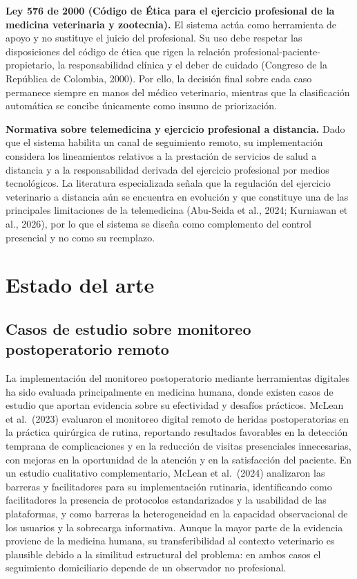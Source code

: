 \documentclass[stu, spanish]{apa7}
\begin{document}
\textbf{Ley 576 de 2000 (C\'{o}digo de \'{E}tica para el ejercicio profesional de la medicina veterinaria y zootecnia).} El sistema act\'{u}a como herramienta de apoyo y no sustituye el juicio del profesional. Su uso debe respetar las disposiciones del c\'{o}digo de \'{e}tica que rigen la relaci\'{o}n profesional-paciente-propietario, la responsabilidad cl\'{i}nica y el deber de cuidado (Congreso de la Rep\'{u}blica de Colombia, 2000). Por ello, la decisi\'{o}n final sobre cada caso permanece siempre en manos del m\'{e}dico veterinario, mientras que la clasificaci\'{o}n autom\'{a}tica se concibe \'{u}nicamente como insumo de priorizaci\'{o}n.

\textbf{Normativa sobre telemedicina y ejercicio profesional a distancia.} Dado que el sistema habilita un canal de seguimiento remoto, su implementaci\'{o}n considera los lineamientos relativos a la prestaci\'{o}n de servicios de salud a distancia y a la responsabilidad derivada del ejercicio profesional por medios tecnol\'{o}gicos. La literatura especializada se\~{n}ala que la regulaci\'{o}n del ejercicio veterinario a distancia a\'{u}n se encuentra en evoluci\'{o}n y que constituye una de las principales limitaciones de la telemedicina (Abu-Seida et al., 2024; Kurniawan et al., 2026), por lo que el sistema se dise\~{n}a como complemento del control presencial y no como su reemplazo.

\section{Estado del arte}

\subsection{Casos de estudio sobre monitoreo postoperatorio remoto}
La implementaci\'{o}n del monitoreo postoperatorio mediante herramientas digitales ha sido evaluada principalmente en medicina humana, donde existen casos de estudio que aportan evidencia sobre su efectividad y desaf\'{i}os pr\'{a}cticos. McLean et al.\ (2023) evaluaron el monitoreo digital remoto de heridas postoperatorias en la pr\'{a}ctica quir\'{u}rgica de rutina, reportando resultados favorables en la detecci\'{o}n temprana de complicaciones y en la reducci\'{o}n de visitas presenciales innecesarias, con mejoras en la oportunidad de la atenci\'{o}n y en la satisfacci\'{o}n del paciente. En un estudio cualitativo complementario, McLean et al.\ (2024) analizaron las barreras y facilitadores para su implementaci\'{o}n rutinaria, identificando como facilitadores la presencia de protocolos estandarizados y la usabilidad de las plataformas, y como barreras la heterogeneidad en la capacidad observacional de los usuarios y la sobrecarga informativa. Aunque la mayor parte de la evidencia proviene de la medicina humana, su transferibilidad al contexto veterinario es plausible debido a la similitud estructural del problema: en ambos casos el seguimiento domiciliario depende de un observador no profesional.
\end{document}
